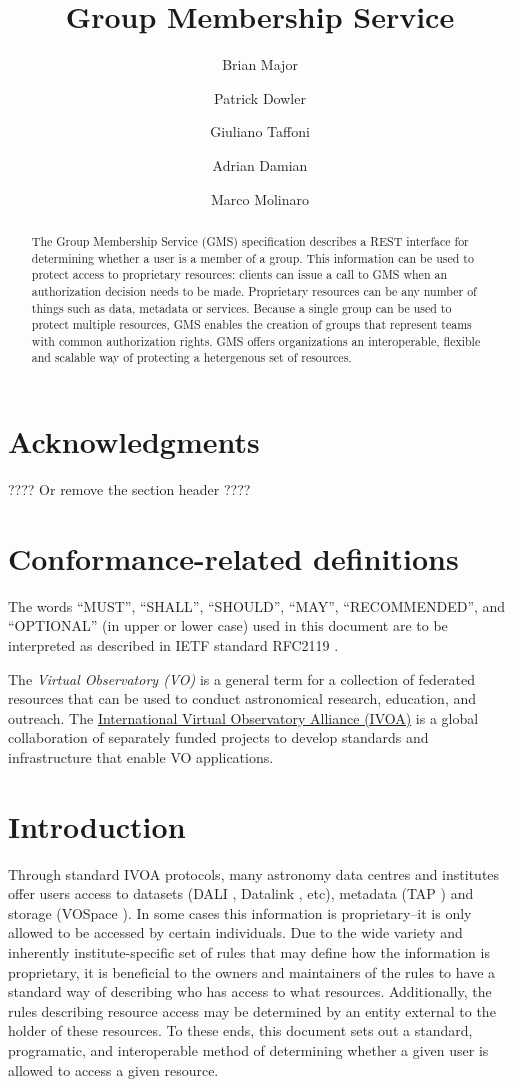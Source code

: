 \documentclass[11pt,a4paper]{ivoa}
\title{Group Membership Service}
\author{Brian Major}
\author{Patrick Dowler}
\author{Giuliano Taffoni}
\author{Adrian Damian}
\author{Marco Molinaro}
\begin{document}
\begin{abstract}

The Group Membership Service (GMS) specification describes a REST interface for determining whether a user is a member of a group.  This information can be used to protect access to proprietary resources: clients can issue a call to GMS when an authorization decision needs to be made.  Proprietary resources can be any number of things such as data, metadata or services.  Because a single group can be used to protect multiple resources, GMS enables the creation of groups that represent teams with common authorization rights.  GMS offers organizations an interoperable, flexible and scalable way of protecting a hetergenous set of resources.

\end{abstract}

\section*{Acknowledgments}

???? Or remove the section header ????

\section*{Conformance-related definitions}

The words ``MUST'', ``SHALL'', ``SHOULD'', ``MAY'', ``RECOMMENDED'', and
``OPTIONAL'' (in upper or lower case) used in this document are to be
interpreted as described in IETF standard RFC2119 \citep{std:RFC2119}.

The \emph{Virtual Observatory (VO)} is a
general term for a collection of federated resources that can be used
to conduct astronomical research, education, and outreach.
The \href{http://www.ivoa.net}{International
Virtual Observatory Alliance (IVOA)} is a global
collaboration of separately funded projects to develop standards and
infrastructure that enable VO applications.


\section{Introduction}

Through standard IVOA protocols, many astronomy data centres and institutes offer users access to datasets (DALI \citep{std:DALI}, Datalink \citep{std:Datalink}, etc), metadata (TAP \citep{std:TAP}) and storage (VOSpace \citep{std:VOSpace}).  In some cases this information is proprietary--it is only allowed to be accessed by certain individuals.  Due to the wide variety and inherently institute-specific set of rules that may define how the information is proprietary, it is beneficial to the owners and maintainers of the rules to have a standard way of describing who has access to what resources.  Additionally, the rules describing resource access may be determined by an entity external to the holder of these resources.  To these ends, this document sets out a standard, programatic, and interoperable method of determining whether a given user is allowed to access a given resource.
\end{document}

